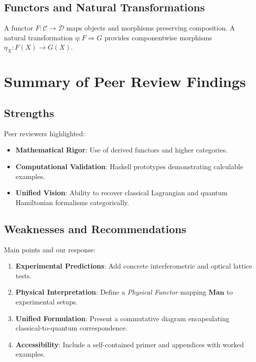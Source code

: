 \documentclass[11pt,a4paper]{article}
\newcommand{\Man}{\mathbf{Man}}
\begin{document}
\subsection{Functors and Natural Transformations}
A functor $F:\mathcal{C}\to\mathcal{D}$ maps objects and morphisms preserving composition. A natural transformation $\eta:F\Rightarrow G$ provides componentwise morphisms $\eta_X: F(X)\to G(X)$.

\section{Summary of Peer Review Findings}
\subsection{Strengths}
Peer reviewers highlighted:
\begin{itemize}
  \item \textbf{Mathematical Rigor}: Use of derived functors and higher categories.
  \item \textbf{Computational Validation}: Haskell prototypes demonstrating calculable examples.
  \item \textbf{Unified Vision}: Ability to recover classical Lagrangian and quantum Hamiltonian formalisms categorically.
\end{itemize}

\subsection{Weaknesses and Recommendations}
Main points and our response:
\begin{enumerate}
  \item \textbf{Experimental Predictions}: Add concrete interferometric and optical lattice tests.
  \item \textbf{Physical Interpretation}: Define a \emph{Physical Functor} mapping $\Man$ to experimental setups.
  \item \textbf{Unified Formulation}: Present a commutative diagram encapsulating classical-to-quantum correspondence.
  \item \textbf{Accessibility}: Include a self-contained primer and appendices with worked examples.
\end{enumerate}
\end{document}
